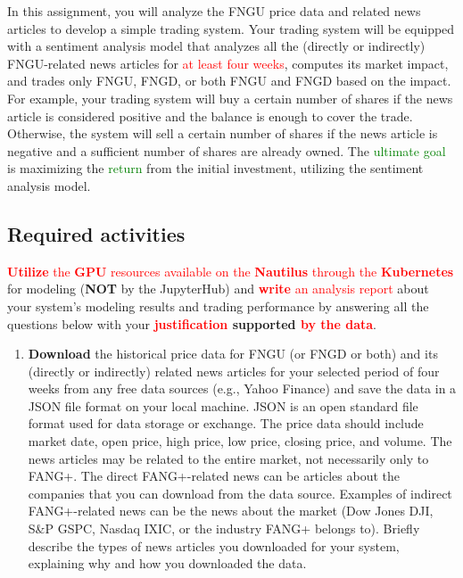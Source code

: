 \documentclass[twocolumn,10pt]{article}
\begin{document}
\begin{multicols}{2}
\begin{flushleft}
In this assignment, you will analyze the FNGU price data and related news articles to develop a simple trading system. Your trading system will be equipped with a sentiment analysis model that analyzes all the (directly or indirectly) FNGU-related news articles for \textcolor{red}{at least four weeks}, computes its market impact, and trades only FNGU, FNGD, or both FNGU and FNGD based on the impact. For example, your trading system will buy a certain number of shares if the news article is considered positive and the balance is enough to cover the trade. Otherwise, the system will sell a certain number of shares if the news article is negative and a sufficient number of shares are already owned. The \textcolor{green}{ultimate goal} is maximizing the \textcolor{green}{return} from the initial investment, utilizing the sentiment analysis model.

\subsection*{Required activities}
\textcolor{red}{\textbf{Utilize} the \textbf{GPU} resources available on the \textbf{Nautilus} through the \textbf{Kubernetes}} for modeling (\textbf{NOT} by the JupyterHub) and \textcolor{red}{\textbf{write} an analysis report} about your system's modeling results and trading performance by answering all the questions below with your \textbf{\textcolor{red}{justification} supported \textcolor{red}{by the data}}.

\begin{enumerate}
	\item \textbf{Download} the historical price data for FNGU (or FNGD or both) and its (directly or indirectly) related news articles for your selected period of four weeks from any free data sources (e.g., Yahoo Finance) and save the data in a JSON file format on your local machine. JSON is an open standard file format used for data storage or exchange. The price data should include market date, open price, high price, low price, closing price, and volume. The news articles may be related to the entire market, not necessarily only to FANG+. The direct FANG+-related news can be articles about the companies that you can download from the data source. Examples of indirect FANG+-related news can be the news about the market (Dow Jones \scalebox{.8}{\textsuperscript{$\wedge$}}DJI, S\&P \scalebox{.8}{\textsuperscript{$\wedge$}}GSPC, Nasdaq \scalebox{.8}{\textsuperscript{$\wedge$}}IXIC, or the industry FANG+ belongs to). Briefly describe the types of news articles you downloaded for your system, explaining why and how you downloaded the data.\\
	

\end{enumerate}
\end{flushleft}
\end{multicols}
\end{document}
